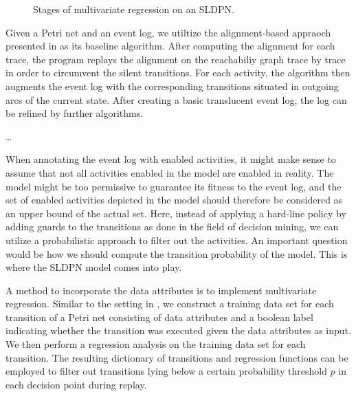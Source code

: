 \begin{figure}
    \centering
    \caption{Stages of multivariate regression on an SLDPN.}
    \label{sldpn-multivar-regression}
\end{figure}

Given a Petri net and an event log, we utiltize the alignment-based appraoch presented in \cite{creating-translucent-event-logs} as its baseline algorithm. After computing the alignment for each trace, the program replays the alignment on the reachabiliy graph trace by trace in order to circumvent the silent transitions. For each activity, the algorithm then augments the event log with the corresponding transitions situated in outgoing arcs of the current state. After creating a basic translucent event log, the log can be refined by further algorithms.

\dots

When annotating the event log with enabled activities, it might make sense to assume that not all activities enabled in the model are enabled in reality. The model might be too permissive to guarantee its fitness to the event log, and the set of enabled activities depicted in the model should therefore be considered as an upper bound of the actual set. Here, instead of applying a hard-line policy by adding guards to the transitions as done in the field of decision mining, we can utilize a probabilistic approach to filter out the activities. An important question would be how we should compute the transition probability of the model. This is where the SLDPN model comes into play.

A method to incorporate the data attributes is to implement multivariate regression. Similar to the setting in \cite{sldpn}, we construct a training data set for each transition of a Petri net consisting of data attributes and a boolean label indicating whether the transition was executed given the data attributes as input. We then perform a regression analysis on the training data set for each transition. The resulting dictionary of transitions and regression functions can be employed to filter out transitions lying below a certain probability threshold $p$ in each decision point during replay.

